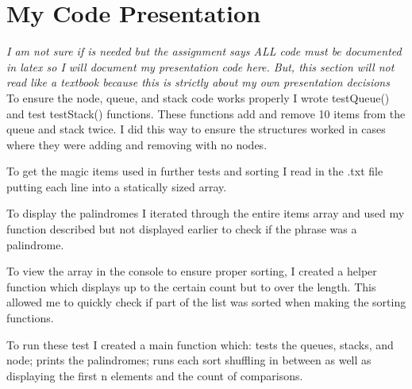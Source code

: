\documentclass[letterpaper, 10pt]{article}
\begin{document}
\section{My Code Presentation}
\textit{I am not sure if is needed but the assignment says ALL code must 
be documented in latex so I will document my presentation code here. But, this
section will not read like a textbook because this is strictly about my own
presentation decisions} \\
\noindent
\newline
To ensure the node, queue, and stack code works properly I wrote testQueue() and test testStack()
functions. These functions add and remove 10 items from the queue and stack twice. I did this way
to ensure the structures worked in cases where they were adding and removing with no nodes.

To get the magic items used in further tests and sorting I read in the .txt file putting each line
into a statically sized array.

To display the palindromes I iterated through the entire items array and used my function described
but not displayed earlier to check if the phrase was a palindrome.

\newpage
To view the array in the console to ensure proper sorting, I created a helper function which
displays up to the certain count but to over the length. This allowed me to quickly check if
part of the list was sorted when making the sorting functions.

To run these test I created a main function which: tests the queues, stacks, and node;
prints the palindromes; runs each sort shuffling in between as well as displaying the
first n elements and the count of comparisons.

\end{document}
